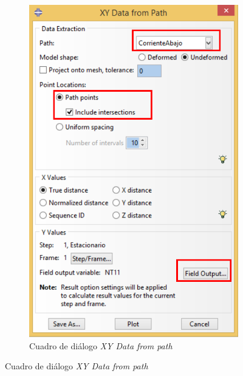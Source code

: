 \begin{itemize}
\begin{figure}[!h]
\begin{subfigure}[!h]{0.44\textwidth}
      \includegraphics[width=\textwidth]{./body/images/post13.pdf}
      \caption{Cuadro de diálogo \textit{XY Data from path}}
      \label{post13}
    \end{subfigure}%
    

\end{figure}
\end{itemize}
